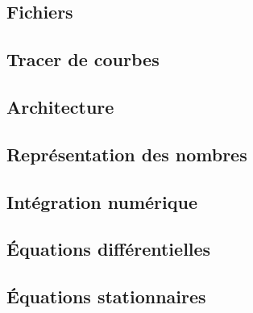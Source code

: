 \documentclass[10pt,fleqn]{article} %
\begin{document}
\begin{multicols}{2}
\section{Fichiers}

\end{multicols}
\newpage

\begin{multicols}{2}
\section{Tracer de courbes}

\end{multicols}
\newpage

\begin{multicols}{2}
\section{Architecture}

\end{multicols}
\newpage

\begin{multicols}{2}
\section{Représentation des nombres}

\end{multicols}
\newpage

\begin{multicols}{2}
\section{Intégration numérique}

\end{multicols}
\newpage

\begin{multicols}{2}
\section{Équations différentielles}

\end{multicols}
\newpage

\begin{multicols}{2}
\section{Équations stationnaires}

\end{multicols}
\end{document}
